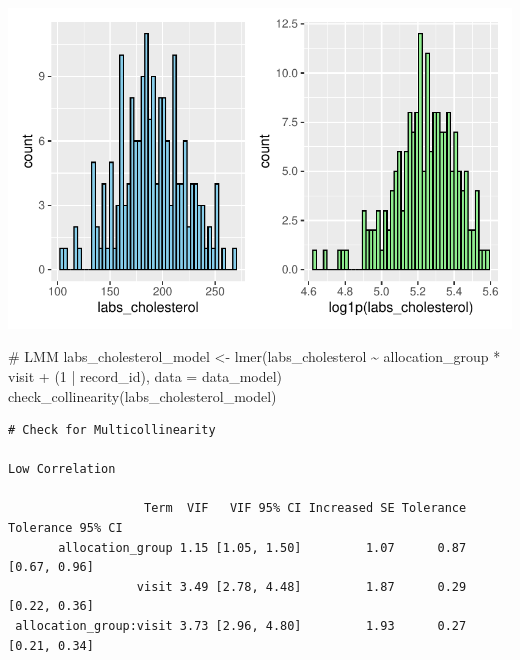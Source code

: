 \documentclass[
  12pt,
]{article}
\newenvironment{Shaded}{\begin{snugshade}}{\end{snugshade}}
\newcommand{\AttributeTok}[1]{\textcolor[rgb]{0.40,0.45,0.13}{#1}}
\newcommand{\CommentTok}[1]{\textcolor[rgb]{0.37,0.37,0.37}{#1}}
\newcommand{\DecValTok}[1]{\textcolor[rgb]{0.68,0.00,0.00}{#1}}
\newcommand{\FunctionTok}[1]{\textcolor[rgb]{0.28,0.35,0.67}{#1}}
\newcommand{\NormalTok}[1]{\textcolor[rgb]{0.00,0.23,0.31}{#1}}
\newcommand{\OtherTok}[1]{\textcolor[rgb]{0.00,0.23,0.31}{#1}}
\newcommand{\SpecialCharTok}[1]{\textcolor[rgb]{0.37,0.37,0.37}{#1}}
\begin{document}
\includegraphics{Outcomes_files/figure-pdf/labs_cholesterol_1-1.pdf}

\begin{Shaded}
\begin{Highlighting}[]
\CommentTok{\# LMM}
\NormalTok{labs\_cholesterol\_model }\OtherTok{\textless{}{-}} \FunctionTok{lmer}\NormalTok{(labs\_cholesterol }\SpecialCharTok{\textasciitilde{}}\NormalTok{ allocation\_group }\SpecialCharTok{*}\NormalTok{ visit }\SpecialCharTok{+} 
\NormalTok{(}\DecValTok{1} \SpecialCharTok{|}\NormalTok{ record\_id), }\AttributeTok{data =}\NormalTok{ data\_model)}
\FunctionTok{check\_collinearity}\NormalTok{(labs\_cholesterol\_model)}
\end{Highlighting}
\end{Shaded}

\begin{verbatim}
# Check for Multicollinearity

Low Correlation

                   Term  VIF   VIF 95% CI Increased SE Tolerance Tolerance 95% CI
       allocation_group 1.15 [1.05, 1.50]         1.07      0.87     [0.67, 0.96]
                  visit 3.49 [2.78, 4.48]         1.87      0.29     [0.22, 0.36]
 allocation_group:visit 3.73 [2.96, 4.80]         1.93      0.27     [0.21, 0.34]
\end{verbatim}
\end{document}

